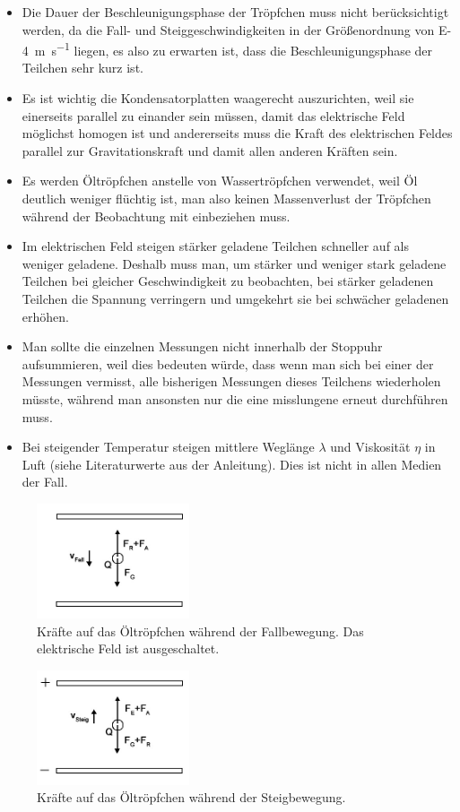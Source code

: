 \documentclass[
	a4paper,
	12pt,
	pagesize,
	ngerman
]{scrartcl}
\begin{document}
\begin{itemize}
		\item Die Dauer der Beschleunigungsphase der Tröpfchen muss nicht berücksichtigt werden, da die Fall- und Steiggeschwindigkeiten in der Größenordnung von \SI{E-4}{\meter \per \second} liegen, es also zu erwarten ist, dass die Beschleunigungsphase der Teilchen sehr kurz ist. 
		\item Es ist wichtig die Kondensatorplatten waagerecht auszurichten, weil sie einerseits parallel zu einander sein müssen, damit das elektrische Feld möglichst homogen ist und andererseits muss die Kraft des elektrischen Feldes parallel zur Gravitationskraft und damit allen anderen Kräften sein.
		\item Es werden Öltröpfchen anstelle von Wassertröpfchen verwendet, weil Öl deutlich weniger flüchtig ist, man also keinen Massenverlust der Tröpfchen während der Beobachtung mit einbeziehen muss.
		\item Im elektrischen Feld steigen stärker geladene Teilchen schneller auf als weniger geladene. Deshalb muss man, um stärker und weniger stark geladene Teilchen bei gleicher Geschwindigkeit zu beobachten, bei stärker geladenen Teilchen die Spannung verringern und umgekehrt sie bei schwächer geladenen erhöhen.
		\item Man sollte die einzelnen Messungen nicht innerhalb der Stoppuhr aufsummieren, weil dies bedeuten würde, dass wenn man sich bei einer der Messungen vermisst, alle bisherigen Messungen dieses Teilchens wiederholen müsste, während man ansonsten nur die eine misslungene erneut durchführen muss.
		\item Bei steigender Temperatur steigen mittlere Weglänge $ \lambda $ und Viskosität $ \eta $ in Luft (siehe Literaturwerte aus der Anleitung). %
		Dies ist nicht in allen Medien der Fall.
	\end{itemize}
	\begin{figure}[H]
		\includegraphics[width=0.4\textwidth]{fall}
		\centering
		\caption{Kräfte auf das Öltröpfchen während der Fallbewegung. Das elektrische Feld ist ausgeschaltet.\cite{RCL}}
		\label{fall}
		\centering
	\end{figure} 
	\begin{figure}[H]
		\includegraphics[width=0.4\textwidth]{steig}
		\centering
		\caption{Kräfte auf das Öltröpfchen während der Steigbewegung.\cite{RCL}}
		\label{steig}
		\centering
	\end{figure} 
\end{document}
